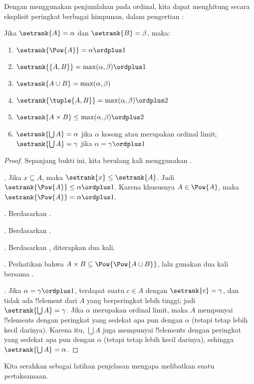 \documentclass[../../../include/open-logic-section]{subfiles}
\begin{document}

Dengan menggunakan penjumlahan pada ordinal, kita dapat menghitung secara
eksplisit peringkat berbagai himpunan, dalam pengertian
:

\begin{lem}
Jika $\setrank{A} = \alpha$ dan $\setrank{B} = \beta$, maka:
\begin{enumerate}
	\item{} $\setrank{\Pow{A}} = \alpha\ordplus 1$
	\item{} $\setrank{\{A, B\}} = \max(\alpha,
	\beta) \ordplus 1$
	\item{} $\setrank{A \cup B} = \max(\alpha,
	\beta)$
	\item{} $\setrank{\tuple{A,B}} = \max(\alpha,
	\beta) \ordplus  2$
	\item{} $\setrank{A \times B} \leq \max(\alpha,
	\beta) \ordplus  2$
	\item{} $\setrank{\bigcup A} = \alpha$ jika
	$\alpha$ kosong atau merupakan ordinal limit; $\setrank{\bigcup A} = \gamma$
	jika $\alpha = \gamma\ordplus 1$
\end{enumerate}
\end{lem}

\begin{proof}
Sepanjang bukti ini, kita berulang kali menggunakan
.

\emph{.} Jika $x \subseteq A$, maka $\setrank{x} \leq
\setrank{A}$. Jadi $\setrank{\Pow{A}} \leq \alpha \ordplus  1$. Karena
khususnya $A \in \Pow{A}$, maka $\setrank{\Pow{A}} = \alpha \ordplus  1$.

\emph{.} Berdasarkan .

\emph{.} Berdasarkan .

\emph{.} Berdasarkan , diterapkan dua
kali.

\emph{.} Perhatikan bahwa $A \times B \subseteq
\Pow{\Pow{A \cup B}}$, lalu gunakan  dua kali bersama
.

\emph{.} Jika $\alpha = \gamma\ordplus 1$, terdapat
suatu $c \in A$ dengan $\setrank{c} = \gamma$, dan tidak ada !!{element}
dari $A$ yang berperingkat lebih tinggi; jadi $\setrank{\bigcup A} =
\gamma$. Jika $\alpha$ merupakan ordinal limit, maka $A$ mempunyai
!!{element}s dengan peringkat yang sedekat apa pun dengan $\alpha$ (tetapi
tetap lebih kecil darinya). Karena itu, $\bigcup A$ juga mempunyai
!!{element}s dengan peringkat yang sedekat apa pun dengan $\alpha$ (tetapi
tetap lebih kecil darinya), sehingga $\setrank{\bigcup A} = \alpha$.
\end{proof}
\noindent
Kita serahkan sebagai latihan penjelasan mengapa 
melibatkan suatu \emph{per}taksamaan.
\end{document}

